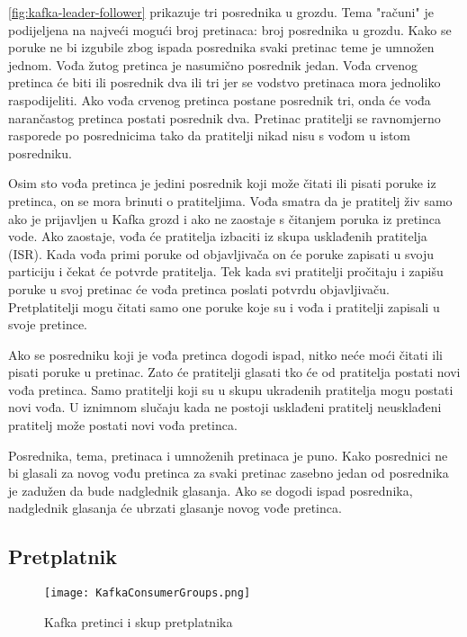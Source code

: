\documentclass[utf8, diplomski, lmodern, numeric]{fer}
\begin{document}
\ref{fig:kafka-leader-follower} prikazuje tri posrednika u grozdu. Tema "računi" je podijeljena na najveći mogući broj pretinaca: broj posrednika u grozdu. Kako se poruke ne bi izgubile zbog ispada posrednika svaki pretinac teme je umnožen jednom. Vođa žutog pretinca je nasumično posrednik jedan. Vođa crvenog pretinca će biti ili posrednik dva ili tri jer se vodstvo pretinaca mora jednoliko raspodijeliti. Ako vođa crvenog pretinca postane posrednik tri, onda će vođa narančastog pretinca postati posrednik dva. Pretinac pratitelji se ravnomjerno rasporede po posrednicima tako da pratitelji nikad nisu s vođom u istom posredniku.

Osim sto vođa pretinca je jedini posrednik koji može čitati ili pisati poruke iz pretinca, on se mora brinuti o pratiteljima. Vođa smatra da je pratitelj živ samo ako je prijavljen u Kafka grozd i ako ne zaostaje s čitanjem poruka iz pretinca vode. Ako zaostaje, vođa će pratitelja izbaciti iz skupa usklađenih pratitelja (ISR). Kada vođa primi poruke od objavljivača on će poruke zapisati u svoju particiju i čekat će potvrde pratitelja. Tek kada svi pratitelji pročitaju i zapišu poruke u svoj pretinac će vođa pretinca poslati potvrdu objavljivaču. Pretplatitelji mogu čitati samo one poruke koje su i vođa i pratitelji zapisali u svoje pretince.

Ako se posredniku koji je vođa pretinca dogodi ispad, nitko neće moći čitati ili pisati poruke u pretinac. Zato će pratitelji glasati tko će od pratitelja postati novi vođa pretinca. Samo pratitelji koji su u skupu ukradenih pratitelja mogu postati novi vođa. U iznimnom slučaju kada ne postoji usklađeni pratitelj neusklađeni pratitelj može postati novi vođa pretinca.

Posrednika, tema, pretinaca i umnoženih pretinaca je puno. Kako posrednici ne bi glasali za novog vođu pretinca za svaki pretinac zasebno jedan od posrednika je zadužen da bude nadglednik glasanja. Ako se dogodi ispad posrednika, nadglednik glasanja će ubrzati glasanje novog vođe pretinca.

\subsection{Pretplatnik}

\begin{figure}[H]
    \centering
    \texttt{[image: KafkaConsumerGroups.png]}
    \caption{Kafka pretinci i skup pretplatnika}
    \label{fig:kafka-consumer-group}
\end{figure}
\end{document}
